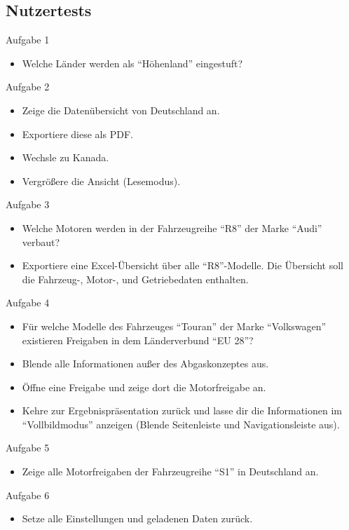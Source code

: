 \subsection{Nutzertests}
Aufgabe 1
\begin{itemize}
	\item Welche Länder werden als \enquote{Höhenland} eingestuft?
\end{itemize}
Aufgabe 2
\begin{itemize}
	\item Zeige die Datenübersicht von Deutschland an.
	\item Exportiere diese als PDF.
	\item Wechsle zu Kanada.
	\item Vergrößere die Ansicht (Lesemodus).
\end{itemize}
Aufgabe 3
\begin{itemize}
	\item Welche Motoren werden in der Fahrzeugreihe \enquote{R8} der Marke \enquote{Audi} verbaut?
	\item Exportiere eine Excel-Übersicht über alle \enquote{R8}-Modelle. Die Übersicht soll die Fahrzeug-, Motor-, und Getriebedaten enthalten.
\end{itemize}
Aufgabe 4
\begin{itemize}
	\item Für welche Modelle des Fahrzeuges \enquote{Touran} der Marke \enquote{Volkswagen} existieren Freigaben in dem Länderverbund \enquote{EU 28}?
	\item Blende alle Informationen außer des Abgaskonzeptes aus.
	\item Öffne eine Freigabe und zeige dort die Motorfreigabe an.
	\item Kehre zur Ergebnispräsentation zurück und lasse dir die Informationen im \enquote{Vollbildmodus} anzeigen (Blende Seitenleiste und Navigationsleiste aus). 
\end{itemize}
Aufgabe 5
\begin{itemize}
	\item Zeige alle Motorfreigaben der Fahrzeugreihe \enquote{S1} in Deutschland an.
\end{itemize}
Aufgabe 6
\begin{itemize}
	\item Setze alle Einstellungen und geladenen Daten zurück.
\end{itemize}
